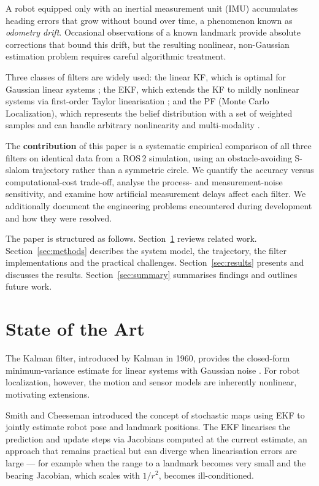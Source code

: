 \documentclass[conference]{IEEEtran}
\begin{document}
A robot equipped only with an inertial measurement unit (IMU) accumulates
heading errors that grow without bound over time, a phenomenon known as
\emph{odometry drift}.
Occasional observations of a known landmark provide absolute corrections that
bound this drift, but the resulting nonlinear, non-Gaussian estimation problem
requires careful algorithmic treatment.

Three classes of filters are widely used: the linear KF, which is optimal for
Gaussian linear systems \cite{Kalman1960New}; the EKF, which extends the KF
to mildly nonlinear systems via first-order Taylor linearisation
\cite{Bar-Shalom2001Estimation}; and the PF (Monte Carlo Localization),
which represents the belief distribution with a set of weighted samples and
can handle arbitrary nonlinearity and multi-modality \cite{Dellaert1999Monte}.

The \textbf{contribution} of this paper is a systematic empirical comparison of
all three filters on identical data from a ROS\,2 simulation, using an
obstacle-avoiding S-slalom trajectory rather than a symmetric circle.
We quantify the accuracy versus computational-cost trade-off, analyse the
process- and measurement-noise sensitivity, and examine how artificial
measurement delays affect each filter.
We additionally document the engineering problems encountered during
development and how they were resolved.

The paper is structured as follows.
Section~\ref{sec:soa} reviews related work.
Section~\ref{sec:methods} describes the system model, the trajectory, the filter
implementations and the practical challenges.
Section~\ref{sec:results} presents and discusses the results.
Section~\ref{sec:summary} summarises findings and outlines future work.

\section{State of the Art}
\label{sec:soa}

The Kalman filter, introduced by Kalman in 1960, provides the closed-form
minimum-variance estimate for linear systems with Gaussian noise
\cite{Kalman1960New}.
For robot localization, however, the motion and sensor models are inherently
nonlinear, motivating extensions.

Smith and Cheeseman \cite{Smith1986Estimating} introduced the concept of stochastic
maps using EKF to jointly estimate robot pose and landmark positions.
The EKF linearises the prediction and update steps via Jacobians computed at
the current estimate, an approach that remains practical but can diverge when
linearisation errors are large --- for example when the range to a landmark
becomes very small and the bearing Jacobian, which scales with $1/r^2$, becomes
ill-conditioned.
\end{document}

